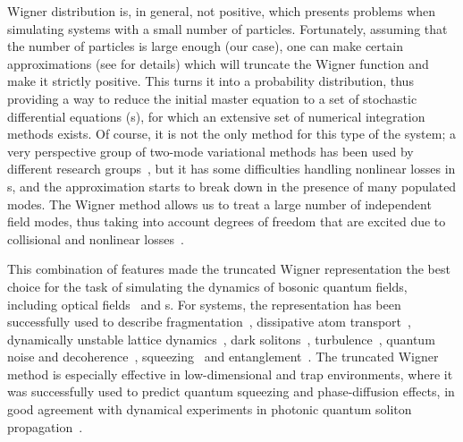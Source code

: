 Wigner distribution is, in general, not positive, which presents problems when simulating systems with a small number of particles.
Fortunately, assuming that the number of particles is large enough (our case), one can make certain approximations (see  for details) which will truncate the Wigner function and make it strictly positive.
This turns it into a probability distribution, thus providing a way to reduce the initial master equation to a set of stochastic differential equations (s), for which an extensive set of numerical integration methods exists.
Of course, it is not the only method for this type of the system; a very perspective group of two-mode variational methods has been used by different research groups~\cite{Li2008,Li2009,Sinatra2011}, but it has some difficulties handling nonlinear losses in s, and the approximation starts to break down in the presence of many populated modes.
The Wigner method allows us to treat a large number of independent field modes, thus taking into account degrees of freedom that are excited due to collisional and nonlinear losses~\cite{Norrie2005,Deuar2007}.

This combination of features made the truncated Wigner representation the best choice for the task of simulating the dynamics of bosonic quantum fields, including optical fields~\cite{Drummond1993,Drummond1993a,Corney2006,Corney2008} and s.
For  systems, the representation has been successfully used to describe fragmentation~\cite{Isella2005,Isella2006,Gross2011}, dissipative atom transport~\cite{Ruostekoski2005}, dynamically unstable lattice dynamics~\cite{Shrestha2009}, dark solitons~\cite{Martin2010,Martin2010a}, turbulence~\cite{Norrie2005,Norrie2006}, quantum noise and decoherence~\cite{Steel1998,Norrie2006a,Egorov2011}, squeezing~\cite{Opanchuk2012} and entanglement~\cite{Opanchuk2012a}.
The truncated Wigner method is especially effective in low-dimensional and trap environments, where it was successfully used to predict quantum squeezing and phase-diffusion effects, in good agreement with dynamical experiments in photonic quantum soliton propagation~\cite{Carter1987,Corney2008}.

